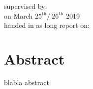 \begin{center}
	\makeatletter
	\thispagestyle{empty}
	\null\vspace{15mm}
	\Huge\textbf{\@title} \\
	\vspace{14mm}
	\Large  \textbf{\@author} \\
	\large supervised by: \textbf{} \\
	\vspace{4mm}
	\large on March $25^{\text{th}} / \ 26^{\text{th}}$ 2019 \\
	\vspace{15mm}
	\large handed in as long report on: \  \@date \\ 
	\makeatother
	\vspace{20mm}
	\section*{Abstract}
\end{center}
blabla abstract

